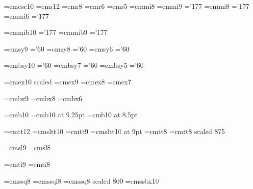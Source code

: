 \font\tensc=cmcsc10 %
\font\twelverm=cmr12
\font\eightrm=cmr8
\font\sixrm=cmr6 \font\fiverm=cmr5
\font\eighti=cmmi8
\font\ninei=cmmi9  \skewchar\ninei='177
\font\eighti=cmmi8  \skewchar\eighti='177
\font\sixi=cmmi6  \skewchar\sixi='177

\font\tenbi=cmmib10  \skewchar\tenbi='177
\font\ninebi=cmmib9  \skewchar\ninebi='177

\font\ninesy=cmsy9  \skewchar\ninesy='60
\font\eightsy=cmsy8  \skewchar\eightsy='60
\font\sixsy=cmsy6  \skewchar\sixsy='60

\font\tenbsy=cmbsy10  \skewchar\tenbsy='60
\font\sevenbsy=cmbsy7  \skewchar\sevenbsy='60
\font\fivebsy=cmbsy5  \skewchar\fivebsy='60

\font\elevenex=cmex10 scaled\magstephalf
\font\nineex=cmex9
\font\eightex=cmex8
\font\sevenex=cmex7

\font\ninebf=cmbx9
\font\eightbf=cmbx8
\font\sixbf=cmbx6

\font\tenthinbf=cmb10
\font\ninethinbf=cmb10 at 9.25pt
\font\eightthinbf=cmb10 at 8.5pt

\font\twelvett=cmtt12  \hyphenchar{}  %
\font\tensltt=cmsltt10  \hyphenchar{}
\font\ninett=cmtt9  \hyphenchar{}
\font\ninesltt=cmsltt10 at 9pt  \hyphenchar{}
\font\eighttt=cmtt8  \hyphenchar{}
\font\seventt=cmtt8 scaled 875  \hyphenchar{}

\font\ninesl=cmsl9
\font\eightsl=cmsl8

\font\nineit=cmti9
\font\eightit=cmti8

\font\eightss=cmssq8
\font\eightssi=cmssqi8
\font\sixss=cmssq8 scaled 800
\font\tenssbx=cmssbx10

\def\footnotesize{\def\rm{\fam0\eightrm}%
  \textfont0=\eightrm \scriptfont0=\sixrm \scriptscriptfont0=\fiverm
  \textfont1=\eighti \scriptfont1=\sixi \scriptscriptfont1=\fivei
  \textfont2=\eightsy \scriptfont2=\sixsy \scriptscriptfont2=\fivesy
  \textfont3=\eightex \scriptfont3=\sevenex \scriptscriptfont3=\sevenex
  \def\it{\fam\itfam\eightit}%
  \textfont\itfam=\eightit
  \def\sl{\fam\slfam\eightsl}%
  \textfont\slfam=\eightsl
  \def\bf{\fam\bffam\eightbf}%
  \textfont\bffam=\eightbf \scriptfont\bffam=\sixbf
   \scriptscriptfont\bffam=\fivebf
  \def\tt{\fam\ttfam\eighttt}%
  \let\sltt=\error
  \textfont\ttfam=\eighttt
  \def\oldstyle{\fam\@ne\eighti}%
  \normalbaselineskip=9pt
  \def\bigfences{\textfont3=\nineex}%
  \let\big=\eightbig
  \let\Big=\eightBig
  \let\bigg=\eightbigg
  \let\Bigg=\eightBigg
  \setbox\strutbox=\hbox{\vrule height7pt depth2pt width\z@}%
  \setbox0=\hbox{$\partial$}%
  \let\adbcfont=\sixrm
  \let\mc=\sevenrm %
  \let\boldit=\error
  \let\ii=\eightii
  \def\MF{{\manfnt opqr}\-{\manfnt stuq}}%
  \normalbaselines\rm}

